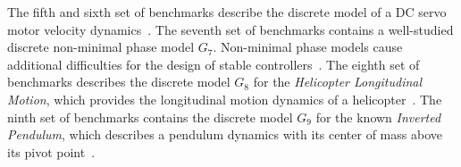\documentclass[final]{sig-alternate-05-2015}
\begin{document}
%
%
%
%
%
%
The fifth and sixth set of benchmarks describe the discrete model 
of a DC servo motor velocity dynamics~\cite{exampleCAD,Tan01}. 
%
The seventh set of benchmarks contains a well-studied discrete non-minimal
phase model $G_{7}$.  Non-minimal phase models cause additional
difficulties for the design of stable
controllers~\cite{Doyle:1991:FCT:574259}.
%
%
%
The eighth set of benchmarks describes the discrete model $G_{8}$ for the
\textit{Helicopter Longitudinal Motion}, which provides the longitudinal
motion dynamics of a helicopter~\cite{Franklin15}.
%
%
The ninth set of benchmarks contains the discrete model $G_{9}$ for the
known \textit{Inverted Pendulum}, which describes a pendulum dynamics with
its center of mass above its pivot point~\cite{Franklin15}.
%
\end{document}
